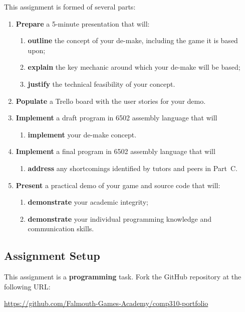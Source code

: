 \documentclass{../../fal_assignment}
\begin{document}
This assignment is formed of several parts:
\begin{enumerate}[label=(\Alph*)]
	\item \textbf{Prepare} a 5-minute presentation that will:
		\begin{enumerate}[label=(\roman*)]
			\item \textbf{outline} the concept of your de-make, including the game it is based upon;
			\item \textbf{explain} the key mechanic around which your de-make will be based;
			\item \textbf{justify} the technical feasibility of your concept.
		\end{enumerate}
	\item \textbf{Populate} a Trello board with the user stories for your demo.
	\item \textbf{Implement} a draft program in 6502 assembly language that will
		\begin{enumerate}[label=(\roman*)]
			\item \textbf{implement} your de-make concept.
		\end{enumerate}
	\item \textbf{Implement} a final program in 6502 assembly language that will
		\begin{enumerate}[label=(\roman*)]
			\item \textbf{address} any shortcomings identified by tutors and peers in Part~C.
		\end{enumerate}
	\item \textbf{Present} a practical demo of your game and source code that will:
		\begin{enumerate}[label=(\roman*)]
			\item \textbf{demonstrate} your academic integrity;
			\item \textbf{demonstrate} your individual programming knowledge and communication skills.
		\end{enumerate}
\end{enumerate}

\subsection*{Assignment Setup}

This assignment is a \textbf{programming} task. Fork the GitHub repository at the following URL:

\indent \url{https://github.com/Falmouth-Games-Academy/comp310-portfolio}
\end{document}
